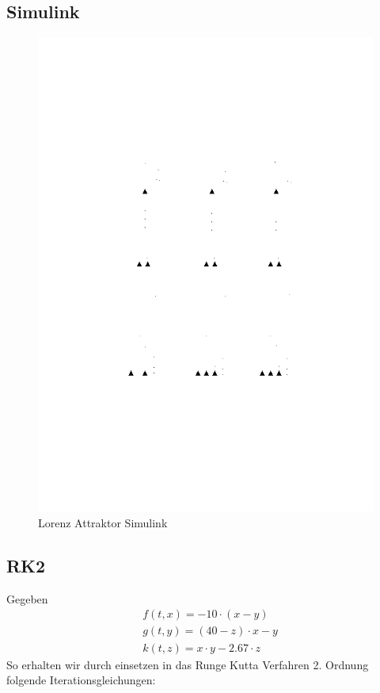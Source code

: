 \documentclass[10pt]{scrartcl}
\begin{document}
		\subsection{Simulink}
		\begin{figure}[H]
			\centering	
			\includegraphics[width=\textwidth, angle=-90]{Prak1Aufg3Simulink.png}
            \caption{Lorenz Attraktor Simulink}
            \label{pic:lorenzSimulink}
		\end{figure} 
		
		
		\subsection{RK2}
		Gegeben
			\begin{align}
				&f(t,x)=-10 \cdot (x-y)\\
				&g(t,y)=(40-z)\cdot x-y\\
				&k(t,z)=x \cdot y - 2.67 \cdot z
			\end{align}
		So erhalten wir durch einsetzen in das Runge Kutta Verfahren 2. Ordnung folgende Iterationsgleichungen:
		
\end{document}
